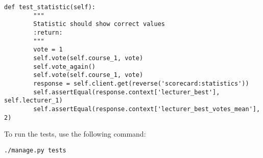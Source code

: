 \begin{lstlisting}[style=Python, caption=scorecard/tests.py, label=lst:tests.py]
    def test_statistic(self):
        """
        Statistic should show correct values
        :return:
        """
        vote = 1
        self.vote(self.course_1, vote)
        self.vote_again()
        self.vote(self.course_1, vote)
        response = self.client.get(reverse('scorecard:statistics'))
        self.assertEqual(response.context['lecturer_best'], self.lecturer_1)
        self.assertEqual(response.context['lecturer_best_votes_mean'], 2)
\end{lstlisting}

To run the tests, use the following command:
\begin{lstlisting}[style=Bash, caption=Run tests, label=lst:run_tests]
./manage.py tests
\end{lstlisting}